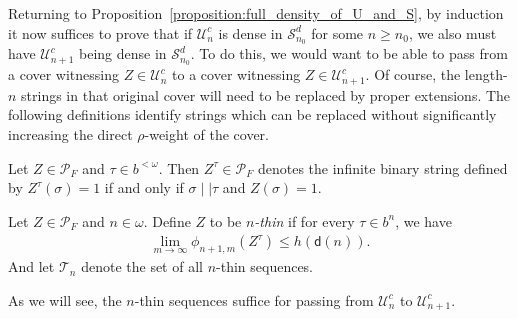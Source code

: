 Returning to Proposition~\ref{proposition:full_density_of_U_and_S}, by induction it now suffices to prove that if $\mathcal{U}^c_n$ is dense in $\mathcal{S}_{n_0}^d$ for some $n \geq n_0$, we also must have $\mathcal{U}_{n + 1}^c$ being dense in $\mathcal{S}_{n_0}^d$. To do this, we would want to be able to pass from a cover witnessing $Z \in \mathcal{U}^c_n$ to a cover witnessing $Z \in \mathcal{U}^c_{n + 1}$. Of course, the length-$n$ strings in that original cover will need to be replaced by proper extensions. The following definitions identify strings which can be replaced without significantly increasing the direct $\rho$-weight of the cover. 

\begin{definition}
    Let $Z \in \mathcal{P}_F$ and $\tau \in b^{<\omega}.$ Then $Z^{\tau} \in \mathcal{P}_F$ denotes the infinite binary string defined by $Z^{\tau}(\sigma) = 1$ if and only if $\sigma \mid \mid \tau$ and $Z(\sigma) = 1$. 
\end{definition}

\begin{definition}
    Let $Z \in \mathcal{P}_F$ and $n \in \omega$. Define $Z$ to be \textit{$n$-thin} if for every $\tau \in b^n$, we have
    \begin{align*}
        \lim_{m \to \infty} \phi_{n+1, m}(Z^\tau) \leq h(\mathsf{d}(n)).
    \end{align*}
    And let $\mathcal{T}_n$ denote the set of all $n$-thin sequences.
\end{definition}

As we will see, the $n$-thin sequences suffice for passing from $\mathcal{U}^c_n$ to $\mathcal{U}^c_{n+1}$. 

